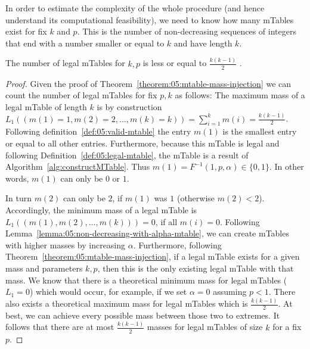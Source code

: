 In order to estimate the complexity of the whole procedure (and hence understand its computational feasibility), we need to know how many mTables exist for fix $k$ and $p$.
%
This is the number of non-decreasing sequences of integers that end with a number smaller or equal to $k$ and have length $k$.
%
\begin{theorem}
	\label{theorem:05:number-of-mtables}
	The number of legal mTables for $k,p$ is less or equal to $\frac{k(k-1)}{2}$ .
\end{theorem}

\begin{proof}
	\label{proof:05:number-of-mtables}
	Given the proof of Theorem~\ref{theorem:05:mtable-mass-injection} we can count the number of legal mTables for fix $p,k$ as follows: The maximum mass of a legal mTable of length $k$ is by construction
	$L_1 ((m(1) = 1,m(2) = 2, \ldots, m(k) = k)) = \sum_{i=1}^k m(i) = \frac{k(k-1)}{2}$. 
	Following definition~\ref{def:05:valid-mtable} the 	    entry $m(1)$ is the smallest entry or equal to all other entries. 
	Furthermore, because this mTable is legal and following Definition~\ref{def:05:legal-mtable}, the mTable is a result of Algorithm~\ref{alg:constructMTable}. 
	Thus $m(1) = F^{-1}(1,p,\alpha) \in \lbrace 0,1\rbrace$. In other words, $m(1)$ can only be $0$ or $1$.
	
	In turn $m(2)$ can only be $2$, if $m(1)$ was $1$ (otherwise $m(2)<2$).
	Accordingly, the minimum mass of a legal mTable is $L_1((m(1),m(2), \ldots, m(k))) = 0$, if all $m(i)=0$.
	Following Lemma~\ref{lemma:05:non-decreasing-with-alpha-mtable}, we can create mTables with higher masses by increasing $\alpha$. 
	Furthermore, following Theorem~\ref{theorem:05:mtable-mass-injection}, if a legal mTable exists for a given mass and parameters $k,p$, then this is the only existing legal mTable with that mass.
	We know that there is a theoretical minimum mass for legal mTables ($L_1 =0$) which would occur, for example, if we set $\alpha = 0$ assuming $p<1$.
	There also exists a theoretical maximum mass for legal mTables which is $\frac{k(k-1)}{2}$. 
	At best, we can achieve every possible mass between those two to extremes. 
	It follows that there are at most $\frac{k(k-1)}{2}$ masses for legal mTables of size $k$ for a fix~$p$.
\end{proof}

